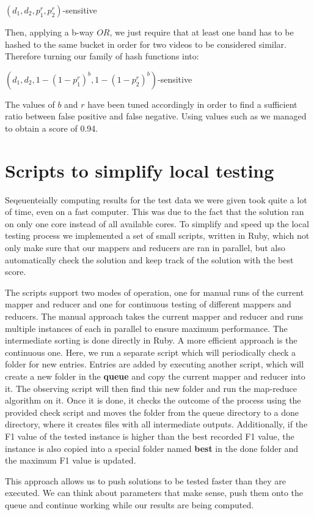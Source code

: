 \documentclass[a4paper, 11pt]{article}
\begin{document}
\vspace{8pt}
\begin{center}
	$(d_{1},d_{2},p_{1}^r,p_{2}^r)$-sensitive
\end{center}
\vspace{8pt}
Then, applying a b-way $OR$, we just require that at least one band has to be hashed to the same bucket in order for two videos to be considered similar. Therefore turning our family of hash functions into:
\vspace{8pt}
\begin{center}
	$(d_{1},d_{2},1-(1-p_{1}^r)^b,1-(1-p_{2}^r)^b)$-sensitive
\end{center}
\vspace{8pt}
The values of $b$ and $r$ have been tuned accordingly in order to find a sufficient ratio between false positive and false negative. Using values such as %
we managed to obtain a score of 0.94.

\section*{Scripts to simplify local testing}
Seqeuenteially computing results for the test data we were given took quite a lot of time, even on a fast
computer. This was due to the fact that the solution ran on only one core instead of all available cores.
To simplify and speed up the local testing process we implemented a set of small scripts, written in Ruby,
which not only make sure that our mappers and reducers are ran in parallel, but also automatically check
the solution and keep track of the solution with the best score.
\vspace{8pt}

The scripts support two modes of operation, one for manual runs of the current mapper and reducer and one
for continuous testing of different mappers and reducers. The manual approach takes the current mapper and
reducer and runs multiple instances of each in parallel to ensure maximum performance. The intermediate 
sorting is done directly in Ruby. A more efficient approach is the continuous one. Here, we run a separate
script which will periodically check a folder for new entries. Entries are added by executing another script,
which will create a new folder in the \textbf{queue} and copy the current mapper and reducer into it. The observing script will then find this new folder and run the map-reduce algorithm on it. Once it is done, it checks the outcome of the process using the provided check script and moves the folder from the queue directory to a done directory, where it creates files with all intermediate outputs. Additionally, if the F1 value of the tested instance is higher than the best recorded F1 value, the instance is also copied into a special folder named \textbf{best} in the done folder and the maximum F1 value is updated.
\vspace{8pt}

This approach allows us to push solutions to be tested faster than they are executed. We can think
about parameters that make sense, push them onto the queue and continue working while our results are
being computed.
\end{document}

